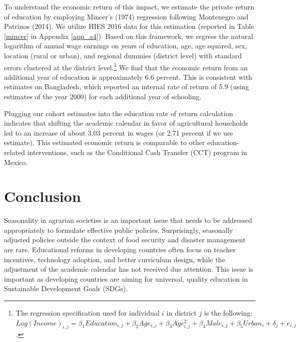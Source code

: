 \documentclass[12pt,letterpaper]{article}\usepackage[margin=1in]{geometry}
\newcommand{\0}{\ensuremath{\mbox{\boldmath $0$}}}
\begin{document}
To understand the economic return of this impact, we estimate the private return of education by employing Mincer's (1974) regression following Montenegro and Patrinos (2014). We utilize HIES 2016 data for this estimation (reported in Table \ref{mincer} in Appendix \ref{app_a4}). Based on this framework, we regress the natural logarithm of annual wage earnings on years of education, age, age squared, sex, location (rural or urban), and regional dummies (district level) with standard errors clustered at the district level.\footnote{The regression specification used for individual $i$ in district $j$ is the following: $Log(Income)_{i,j}=\beta_{1}Education_{i,j}+\beta_{2}Age_{i,j}+\beta_{3}Age^{2}_{i,j}+\beta_{4}Male_{i,j}+\beta_{5}Urban_{i}+\delta_{j}+e_{i,j}$.}
We find that the economic return from an additional year of education is approximately 6.6 percent. This is consistent with \cite{montenegro2014comparable} estimates on Bangladesh, which reported an internal rate of return of 5.9 (using estimates of the year 2000) for each additional year of schooling. 

Plugging our cohort estimates into the education rate of return calculation indicates that shifting the academic calendar in favor of agricultural households led to an increase of about 3.03 percent in wages (or 2.71 percent if we use \cite{montenegro2014comparable} estimate). This estimated economic return is comparable to other education-related interventions, such as the Conditional Cash Transfer (CCT) program in Mexico.


\section{Conclusion}

Seasonality in agrarian societies is an important issue that needs to be addressed appropriately to formulate effective public policies. Surprisingly, seasonally adjusted policies outside the context of food security and disaster management are rare. Educational reforms in developing countries often focus on teacher incentives, technology adoption, and better curriculum design, while the adjustment of the academic calendar has not received due attention. This issue is important as developing countries are aiming for universal, quality education in Sustainable Development Goals (SDGs).
\end{document}

